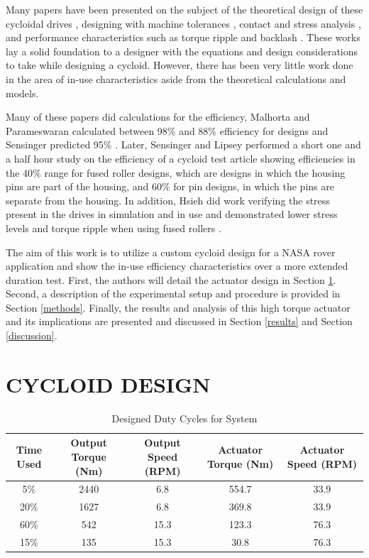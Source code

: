 \documentclass[letterpaper, 10 pt, conference]{ieeeconf}  %
\begin{document}
Many papers have been presented on the subject of the theoretical design of these cycloidal drives \cite{on_the_lobe} \cite{hwang_hsieh}, designing with machine tolerances \cite{design_and_application}, contact and stress analysis \cite{li}, and performance characteristics such as torque ripple and backlash \cite{hsieh_traditional} \cite{hsieh_dynamics}. These works lay a solid foundation to a designer with the equations and design considerations to take while designing a cycloid. However, there has been very little work done in the area of in-use characteristics aside from the theoretical calculations and models. 

Many of these papers did calculations for the efficiency, Malhorta and Parameswaran calculated between 98\% and 88\% efficiency for designs \cite{Malhorta} and Sensinger predicted 95\% \cite{unified_approach}. Later, Sensinger and Lipsey performed a short one and a half hour study on the efficiency of a cycloid test article \cite{cycloid_vs_harmonic} showing efficiencies in the 40\% range for fused roller designs, which are designs in which the housing pins are part of the housing, and 60\% for pin designs, in which the pins are separate from the housing. In addition, Hsieh did work verifying the stress present in the drives in simulation and in use and demonstrated lower stress levels and torque ripple when using fused rollers \cite{hsieh_dynamics}. 

The aim of this work is to utilize a custom cycloid design for a NASA rover application and show the in-use efficiency characteristics over a more extended duration test. First, the authors will detail the actuator design in Section \ref{design}. Second, a description of the experimental setup and procedure is provided in Section \ref{methods}. Finally, the results and analysis of this high torque actuator and its implications are presented and discussed in Section \ref{results} and Section \ref{discussion}. 

\section{CYCLOID DESIGN} \label{design}

\begin{table}[t]
\caption{Designed Duty Cycles for System}
\label{duty_cycle}
\begin{center}
\begin{tabular}{|c||c||c| |c| |c|}
\hline
Time Used & Output Torque (Nm) & Output Speed (RPM) & Actuator Torque (Nm) & Actuator Speed (RPM)\\
\hline
5\% & 2440 & 6.8 & 554.7 & 33.9\\
\hline
20\% & 1627 & 6.8 & 369.8 & 33.9\\
\hline
60\% & 542 & 15.3 & 123.3 & 76.3\\
\hline
15\% & 135 & 15.3 & 30.8 & 76.3\\
\hline
\end{tabular}
\end{center}
\end{table}
\end{document}
